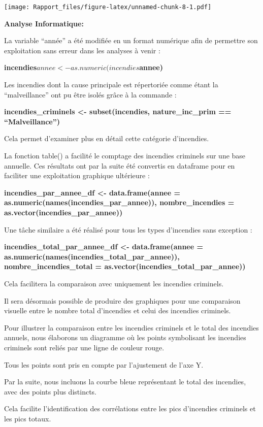 \documentclass[
]{article}
\begin{document}
\texttt{[image: Rapport\_files/figure-latex/unnamed-chunk-8-1.pdf]}

\textbf{Analyse Informatique:}

La variable ``année'' a été modifiée en un format numérique afin de
permettre son exploitation sans erreur dans les analyses à venir :

\textbf{incendies\(annee <- as.numeric(incendies\)annee)}

Les incendies dont la cause principale est répertoriée comme étant la
``malveillance'' ont pu être isolés grâce à la commande :

\textbf{incendies\_criminels \textless- subset(incendies,
nature\_inc\_prim == ``Malveillance'')}

Cela permet d'examiner plus en détail cette catégorie d'incendies.

La fonction table() a facilité le comptage des incendies criminels sur
une base annuelle. Ces résultats ont par la suite été convertis en
dataframe pour en faciliter une exploitation graphique ultérieure :

\textbf{incendies\_par\_annee\_df \textless- data.frame(annee =
as.numeric(names(incendies\_par\_annee)), nombre\_incendies =
as.vector(incendies\_par\_annee))}

Une tâche similaire a été réalisé pour tous les types d'incendies sans
exception :

\textbf{incendies\_total\_par\_annee\_df \textless- data.frame(annee =
as.numeric(names(incendies\_total\_par\_annee)),
nombre\_incendies\_total = as.vector(incendies\_total\_par\_annee))}

Cela facilitera la comparaison avec uniquement les incendies criminels.

Il sera désormais possible de produire des graphiques pour une
comparaison visuelle entre le nombre total d'incendies et celui des
incendies criminels.

Pour illustrer la comparaison entre les incendies criminels et le total
des incendies annuels, nous élaborons un diagramme où les points
symbolisant les incendies criminels sont reliés par une ligne de couleur
rouge.

Tous les points sont pris en compte par l'ajustement de l'axe Y.

Par la suite, nous incluons la courbe bleue représentant le total des
incendies, avec des points plus distincts.

Cela facilite l'identification des corrélations entre les pics
d'incendies criminels et les pics totaux.
\end{document}

